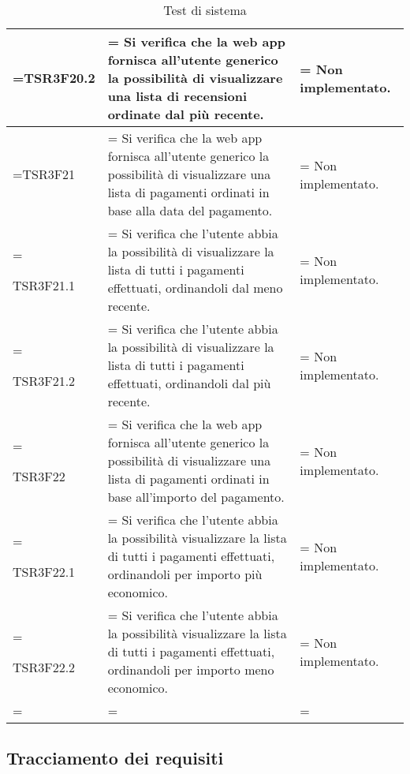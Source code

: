 \begin{xltabular}{\textwidth} {
        >{\hsize\linewidth=\hsize}X
        >{\hsize\linewidth=\hsize}X
        >{\hsize\linewidth=\hsize}X
    }
    TSR3F20.2 &
    Si verifica che la web app fornisca all'utente generico la possibilità di visualizzare una lista di recensioni ordinate dal più recente. &
    Non implementato. 
    \\ \hline

    TSR3F21 &
    Si verifica che la web app fornisca all'utente generico la possibilità di visualizzare una lista di pagamenti ordinati in base alla data del pagamento. &
    Non implementato. 
    \\ \hline

    TSR3F21.1 &
    Si verifica che l'utente abbia la possibilità di visualizzare la lista di tutti i pagamenti
    effettuati, ordinandoli dal meno recente. &
    Non implementato.
    \\ \hline

    TSR3F21.2 &
    Si verifica che l'utente abbia la possibilità di visualizzare la lista di tutti i pagamenti
    effettuati, ordinandoli dal più recente. &
    Non implementato.
    \\ \hline

    TSR3F22 &
    Si verifica che la web app fornisca all'utente generico la possibilità di visualizzare una lista di pagamenti ordinati in base all'importo del pagamento. &
    Non implementato. 
    \\ \hline

    TSR3F22.1 &
    Si verifica che l'utente abbia la possibilità visualizzare la lista di tutti i pagamenti
    effettuati, ordinandoli per importo più economico. &
    Non implementato.
    \\ \hline
    
    TSR3F22.2 &
    Si verifica che l'utente abbia la possibilità visualizzare la lista di tutti i pagamenti
    effettuati, ordinandoli per importo meno economico. &
    Non implementato.
    \\ \hline


    \caption{Test di sistema}
\end{xltabular}

\subsection{Tracciamento dei requisiti}

